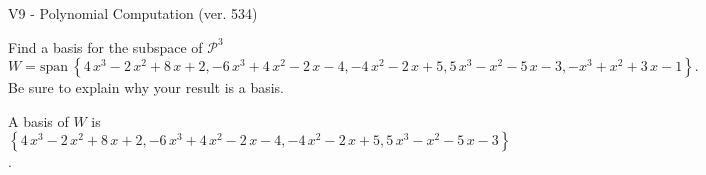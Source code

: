 \begin{exercise}
  \begin{exerciseTitle}V9 - Polynomial Computation (ver. 534)\end{exerciseTitle}
  \begin{exerciseStatement}
    Find a basis for the subspace of \(\mathcal{P}^3\) 
\[W=\mathrm{span}\ \left\{4 \, x^{3} - 2 \, x^{2} + 8 \, x + 2 , -6 \, x^{3} + 4 \, x^{2} - 2 \, x - 4 , -4 \, x^{2} - 2 \, x + 5 , 5 \, x^{3} - x^{2} - 5 \, x - 3 , -x^{3} + x^{2} + 3 \, x - 1\right\}.\]
 Be sure to explain why your result is a basis.


  \end{exerciseStatement}
  \begin{exerciseAnswer}
   A basis of \(W\) is  \(\left\{4 \, x^{3} - 2 \, x^{2} + 8 \, x + 2 , -6 \, x^{3} + 4 \, x^{2} - 2 \, x - 4 , -4 \, x^{2} - 2 \, x + 5 , 5 \, x^{3} - x^{2} - 5 \, x - 3\right\}\).
  


  \end{exerciseAnswer}
\end{exercise}